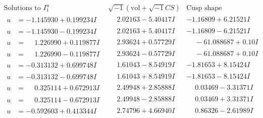 \documentclass[1p]{elsarticle_modified}
\theoremstyle{definition}
\newcommand{\I}{\sqrt{-1}}
\begin{document}
$$\begin{array}{c|c|c}  
\text{Solutions to }I^u_{1}& \I (\text{vol} + \sqrt{-1}CS) & \text{Cusp shape}\\
 \hline 
\begin{aligned}
u &= -1.145930 + 0.199234 I\end{aligned}
 & \phantom{-}2.02163 - 5.40417 I & -1.16809 + 6.21521 I \\ \hline\begin{aligned}
u &= -1.145930 - 0.199234 I\end{aligned}
 & \phantom{-}2.02163 + 5.40417 I & -1.16809 - 6.21521 I \\ \hline\begin{aligned}
u &= \phantom{-}1.226990 + 0.119877 I\end{aligned}
 & \phantom{-}2.93624 + 0.57729 I & \phantom{-}                -6
1.088687 + 0. 10   I\phantom{ +0.000000I} \\ \hline\begin{aligned}
u &= \phantom{-}1.226990 - 0.119877 I\end{aligned}
 & \phantom{-}2.93624 - 0.57729 I & \phantom{-}                -6
1.088687 + 0. 10   I\phantom{ +0.000000I} \\ \hline\begin{aligned}
u &= -0.313132 + 0.699748 I\end{aligned}
 & \phantom{-}1.61043 - 8.54919 I & -1.81653 + 8.15424 I \\ \hline\begin{aligned}
u &= -0.313132 - 0.699748 I\end{aligned}
 & \phantom{-}1.61043 + 8.54919 I & -1.81653 - 8.15424 I \\ \hline\begin{aligned}
u &= \phantom{-}0.325114 + 0.672913 I\end{aligned}
 & \phantom{-}2.49948 + 2.85888 I & \phantom{-}0.03469 - 3.31371 I \\ \hline\begin{aligned}
u &= \phantom{-}0.325114 - 0.672913 I\end{aligned}
 & \phantom{-}2.49948 - 2.85888 I & \phantom{-}0.03469 + 3.31371 I \\ \hline\begin{aligned}
u &= -0.592603 + 0.413344 I\end{aligned}
 & \phantom{-}2.74796 + 4.66940 I & \phantom{-}0.86326 - 2.61989 I \\ \hline\begin{aligned}

\end{aligned}
\end{array}$$
\end{document}
